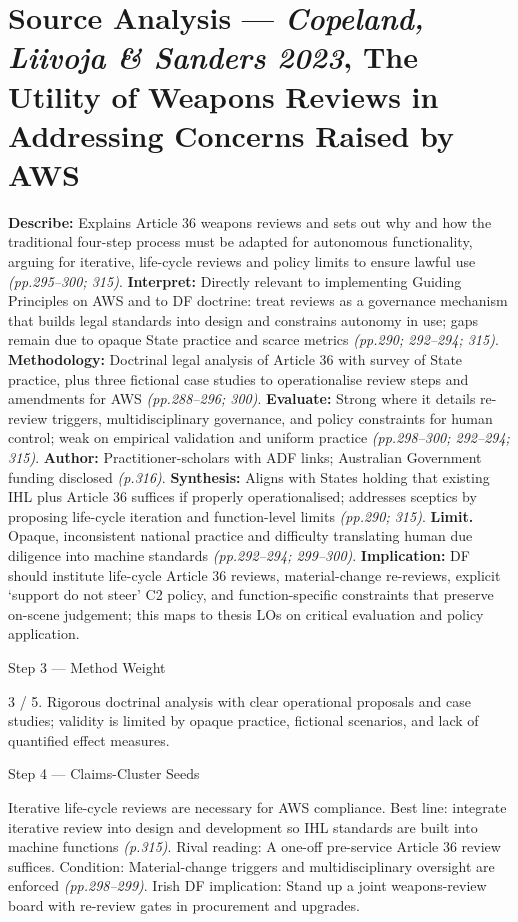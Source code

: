 \section*{Source Analysis — \textit{Copeland, Liivoja & Sanders 2023}, The Utility of Weapons Reviews in Addressing Concerns Raised by AWS}
\textbf{Describe:} Explains Article 36 weapons reviews and sets out why and how the traditional four-step process must be adapted for autonomous functionality, arguing for iterative, life-cycle reviews and policy limits to ensure lawful use \emph{(pp.295–300; 315)}.
\textbf{Interpret:} Directly relevant to implementing Guiding Principles on AWS and to DF doctrine: treat reviews as a governance mechanism that builds legal standards into design and constrains autonomy in use; gaps remain due to opaque State practice and scarce metrics \emph{(pp.290; 292–294; 315)}.
\textbf{Methodology:} Doctrinal legal analysis of Article 36 with survey of State practice, plus three fictional case studies to operationalise review steps and amendments for AWS \emph{(pp.288–296; 300)}.
\textbf{Evaluate:} Strong where it details re-review triggers, multidisciplinary governance, and policy constraints for human control; weak on empirical validation and uniform practice \emph{(pp.298–300; 292–294; 315)}.
\textbf{Author:} Practitioner-scholars with ADF links; Australian Government funding disclosed \emph{(p.316)}.
\textbf{Synthesis:} Aligns with States holding that existing IHL plus Article 36 suffices if properly operationalised; addresses sceptics by proposing life-cycle iteration and function-level limits \emph{(pp.290; 315)}.
\textbf{Limit.} Opaque, inconsistent national practice and difficulty translating human due diligence into machine standards \emph{(pp.292–294; 299–300)}. \textbf{Implication:} DF should institute life-cycle Article 36 reviews, material-change re-reviews, explicit ‘support do not steer’ C2 policy, and function-specific constraints that preserve on-scene judgement; this maps to thesis LOs on critical evaluation and policy application.

Step 3 — Method Weight

3 / 5. Rigorous doctrinal analysis with clear operational proposals and case studies; validity is limited by opaque practice, fictional scenarios, and lack of quantified effect measures.

Step 4 — Claims-Cluster Seeds

Iterative life-cycle reviews are necessary for AWS compliance.
Best line: integrate iterative review into design and development so IHL standards are built into machine functions \emph{(p.315)}.
Rival reading: A one-off pre-service Article 36 review suffices.
Condition: Material-change triggers and multidisciplinary oversight are enforced \emph{(pp.298–299)}.
Irish DF implication: Stand up a joint weapons-review board with re-review gates in procurement and upgrades.

